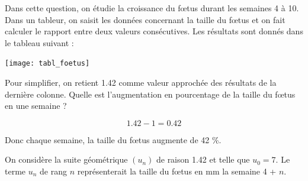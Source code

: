 \documentclass[a4paper,11pt]{exam}
\begin{document}
\begin{questions}
	\question[2] 
	
	\question[2]
		Dans cette question, on étudie la croissance du f\oe tus durant les semaines 4 à 10. Dans un tableur, on saisit les données concernant la taille du f\oe tus et on fait calculer le rapport entre deux valeurs consécutives.
		Les résultats sont donnés dans le tableau suivant :
		
		\begin{center}
			\texttt{[image: tabl\_foetus]}
		\end{center}
		
		Pour simplifier, on retient \num{1.42} comme valeur approchée des résultats de la dernière colonne. Quelle est l'augmentation en pourcentage de la taille du f\oe tus en une semaine ?
		
		\begin{solution}
			\begin{equation*}
				\num{1.42} - 1 = \num{0.42}
			\end{equation*}
			
			Donc chaque semaine, la taille du f\oe tus augmente de 42 \%.
		\end{solution}
		
	\question[4]
		On considère la suite géométrique $(u_n)$ de raison \num{1.42} et telle que $u_0 = 7$. Le terme $u_n$ de rang $n$ représenterait la taille du f\oe tus en mm la semaine 4 + $n$.
		\begin{parts}

\end{parts}
\end{questions}
\end{document}
